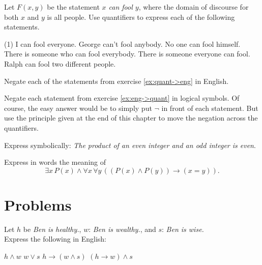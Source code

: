 \begin{exer}\label{ex:eng->quant}
Let $F(x,y)$ be the statement {\itshape $x$ can fool $y$}, where the domain of discourse
for both $x$ and $y$ is  all people. Use quantifiers to express each of the 
following statements. 
\begin{tasks}(1)
	\task I can fool everyone.
	\task George can't fool anybody.
	\task No one can fool himself.
	\task There is someone who can fool everybody. 
	\task There is someone everyone can fool.
	\task Ralph can fool two different people.
\end{tasks}

\end{exer}

\begin{exer}
Negate each of the statements from exercise \ref{ex:quant->eng} in English. 

\end{exer}

\begin{exer}

Negate each statement from exercise \ref{ex:eng->quant} in logical symbols.  Of course, the easy
answer would be to simply put $\neg$ in front of each statement. But use the principle
given at the end of this chapter to move the negation across the quantifiers.

\end{exer}

\begin{exer}

Express symbolically: {\itshape The product of an even integer and an 
odd integer is even}.
\end{exer}

\begin{exer}
Express in words the meaning of 
\[
\exists x \, P(x) \land \forall x \,  \forall y \,\left( (P(x)\land P(y)) \to (x=y)\right).
\]

\end{exer}


\clearpage
\section{Problems}

\begin{prob}\label{bensprob}
Let $h$ be {\itshape Ben is healthy.}, $w$: {\itshape Ben is wealthy.}, and $s$: {\itshape Ben is wise.}\\
Express the following in English:
  \begin{tasks}
     \task $h\land w$
     \task $w \lor s$
     \task $h \to (w \land s)$
     \task $(h \to w) \land s$
   \end{tasks}
\end{prob}

